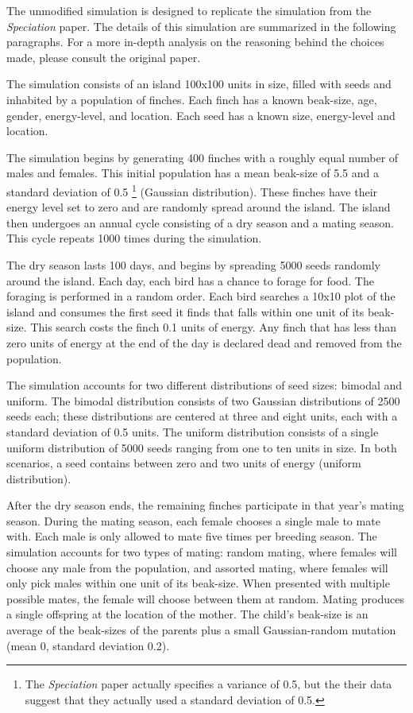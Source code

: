 \documentclass{article}
\begin{document}
The unmodified simulation is designed to replicate the simulation from the \textit{Speciation} paper. The details of this simulation are summarized in the following paragraphs. For a more in-depth analysis on the reasoning behind the choices made, please consult the original paper. 

The simulation consists of an island 100x100 units in size, filled with seeds and inhabited by a population of finches. Each finch has a known beak-size, age, gender, energy-level, and location. Each seed has a known size, energy-level and location.

The simulation begins by generating 400 finches with a roughly equal number of males and females. This initial population has a mean beak-size of 5.5 and a standard deviation of 0.5 \footnote{The \textit{Speciation} paper actually specifies a variance of 0.5, but the their data suggest that they actually used a standard deviation of 0.5.} (Gaussian distribution). These finches have their energy level set to zero and are randomly spread around the island. The island then undergoes an annual cycle consisting of a dry season and a mating season. This cycle repeats 1000 times during the simulation. 

The dry season lasts 100 days, and begins by spreading 5000 seeds randomly around the island. Each day, each bird has a chance to forage for food. The foraging is performed in a random order. Each bird searches a 10x10 plot of the island and consumes the first seed it finds that falls within one unit of its beak-size. This search costs the finch 0.1 units of energy. Any finch that has less than zero units of energy at the end of the day is declared dead and removed from the population.

The simulation accounts for two different distributions of seed sizes: bimodal and uniform. The bimodal distribution consists of two Gaussian distributions of 2500 seeds each; these distributions are centered at three and eight units, each with a standard deviation of 0.5 units. The uniform distribution consists of a single uniform distribution of 5000 seeds ranging from one to ten units in size. In both scenarios, a seed contains between zero and two units of energy (uniform distribution).

After the dry season ends, the remaining finches participate in that year's mating season. During the mating season, each female chooses a single male to mate with. Each male is only allowed to mate five times per breeding season. The simulation accounts for two types of mating: random mating, where females will choose any male from the population, and assorted mating, where females will only pick males within one unit of its beak-size. When presented with multiple possible mates, the female will choose between them at random. Mating produces a single offspring at the location of the mother. The child’s beak-size is an average of the beak-sizes of the parents plus a small Gaussian-random mutation (mean 0, standard deviation 0.2).
\end{document}

